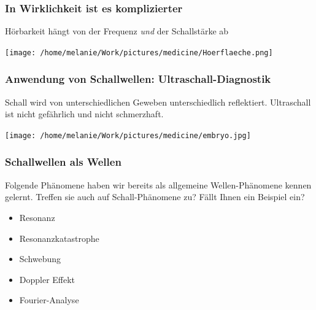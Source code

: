 \documentclass{beamer}
\begin{document}

\begin{frame}
\frametitle{In Wirklichkeit ist es komplizierter}
\pause

Hörbarkeit hängt von der Frequenz \emph{und} der Schallstärke ab

\begin{center}
\texttt{[image: /home/melanie/Work/pictures/medicine/Hoerflaeche.png]}
\end{center}

\end{frame}


\begin{frame}
\end{frame}

\begin{frame}
\end{frame}

\begin{frame}
\end{frame}



\begin{frame}
\frametitle{Anwendung von Schallwellen: Ultraschall-Diagnostik}

Schall wird von unterschiedlichen Geweben unterschiedlich reflektiert. Ultraschall ist nicht gefährlich und nicht schmerzhaft.

\begin{center}
\texttt{[image: /home/melanie/Work/pictures/medicine/embryo.jpg]}
\end{center}



\end{frame}


\begin{frame}

\frametitle{Schallwellen als Wellen}

Folgende Phänomene haben wir bereits als allgemeine Wellen-Phänomene kennen gelernt. Treffen sie auch auf Schall-Phänomene zu? Fällt Ihnen ein Beispiel ein?


\begin{itemize}
\item
 Resonanz
\item
Resonanzkatastrophe
\item
 Schwebung
\item
 Doppler Effekt
\item
Fourier-Analyse
\end{itemize}

\end{frame}
\end{document}
